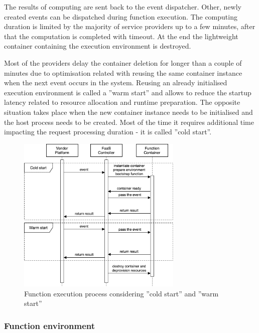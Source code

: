 The results of computing are sent back to the event dispatcher. Other, newly created events can be dispatched during function execution. The computing duration is limited by the majority of service providers up to a few minutes, after that the computation is completed with timeout. At the end the lightweight container containing the execution environment is destroyed.

Most of the providers delay the container deletion for longer than a couple of minutes due to optimisation related with reusing the same container instance when the next event occurs in the system. Reusing an already initialised execution environment is called a ''warm start'' and allows to reduce the startup latency related to resource allocation and runtime preparation. The opposite situation takes place when the new container instance needs to be initialised and the host process needs to be created. Most of the time it requires additional time impacting the request processing duration - it is called ''cold start''.

\begin{figure}[h]
    \centering
    \includegraphics[width=0.7\textwidth]{assets/02-serverless/ServerlessExecution.png}
    \caption{Function execution process considering ''cold start'' and ''warm start''}
    \label{fig:cloudguru-architecture-diagram}
\end{figure}


\subsubsection*{Function environment}

